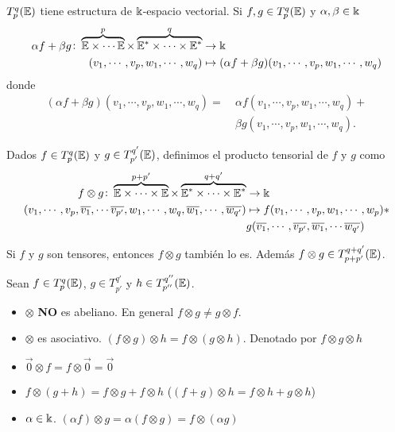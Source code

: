 \begin{prop}
    $T_p^q(\mathbb{E})$ tiene estructura de $\Bbbk$-espacio vectorial. Si $f, g \in T_p^q(\mathbb{E})$ y
    $\alpha , \beta \in \Bbbk$
    \[
        \begin{aligned}
            \alpha f + \beta g \colon \overbrace{\mathbb{E} \times \cdots \mathbb{E}}^p \times
            \overbrace{\mathbb{E}^* \times \cdots \times \mathbb{E}^*}^q &\to \Bbbk \\
            (v_1, \cdots, v_p, w_1, \cdots, w_q) &\mapsto (\alpha f + \beta g)
            (v_1, \cdots, v_p, w_1, \cdots, w_q)
        \end{aligned}
    \]
    donde
    \[
    \begin{aligned}
    (\alpha f + \beta g) (v_1, \cdots, v_p, w_1, \cdots, w_q) = \
    &\alpha f(v_1, \cdots, v_p, w_1, \cdots, w_q) + \\
    &\beta g(v_1, \cdots, v_p, w_1, \cdots, w_q).
    \end{aligned}
    \]
\end{prop}
\begin{defi}
    Dados $f \in T_p^q(\mathbb{E})$ y $g \in T_{p'}^{q'}(\mathbb{E})$, definimos el producto
    tensorial de $f$ y $g$ como
    \[
        \begin{aligned}
            f \otimes g \colon \overbrace{\mathbb{E} \times \cdots \times \mathbb{E}}^{p+p'}
            \times \overbrace{\mathbb{E}^* \times \cdots \times \mathbb{E}^*}^{q+q'} &\to \Bbbk \\
            (v_1, \cdots, v_p, \overline{v_1}, \cdots \overline{v_{p'}},
            w_1, \cdots, w_q, \overline{w_1}, \cdots, \overline{w_{q'}})
            &\mapsto f(v_1, \cdots, v_p, w_1, \cdots, w_p) * \\
            &g(\overline{v_1}, \cdots, \overline{v_{p'}}, \overline{w_1}, \cdots
            \overline{w_{q'}})
        \end{aligned}
    \]
\end{defi}
\begin{obs}
    Si $f$ y $g$ son tensores, entonces $f \otimes g$ también lo es. Además
    $f \otimes g \in T_{p+p'}^{q+q'}(\mathbb{E})$.
\end{obs}
\begin{prop}
    Sean  $f \in T_p^q(\mathbb{E})$, $g \in T_{p'}^{q'}$ y $h \in T_{p''}^{q''}(\mathbb{E})$.
    \begin{itemize}
        \item $\otimes$ {\bfseries NO} es abeliano. En general $f \otimes g \neq
        g \otimes f$.
        \item $\otimes$ es asociativo. $(f \otimes g) \otimes h = f \otimes (g
        \otimes h)$. Denotado por $f \otimes g \otimes h$
        \item $\vec{0} \otimes f = f \otimes \vec{0} = \vec{0}$
        \item $f \otimes (g + h) = f \otimes g + f\otimes h$ \quad ($(f+g) \otimes
        h = f \otimes h + g \otimes h$)
        \item $\alpha \in \Bbbk$. $(\alpha f) \otimes g = \alpha(f \otimes g) =
        f \otimes (\alpha g)$
    \end{itemize}
\end{prop}
